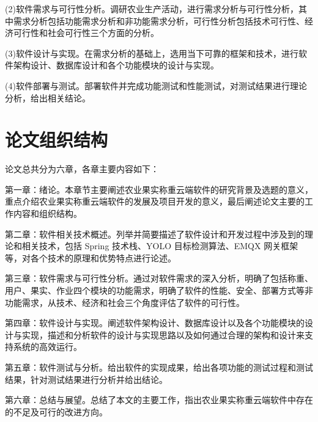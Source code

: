 (2)软件需求与可行性分析。调研农业生产活动，进行需求分析与可行性分析，其中需求分析包括功能需求分析和非功能需求分析，可行性分析包括技术可行性、经济可行性和社会可行性三个方面的分析。

(3)软件设计与实现。在需求分析的基础上，选用当下可靠的框架和技术，进行软件架构设计、数据库设计和各个功能模块的设计与实现。

(4)软件部署与测试。部署软件并完成功能测试和性能测试，对测试结果进行理论分析，给出相关结论。

\section{论文组织结构}

论文总共分为六章，各章主要内容如下：

第一章：绪论。本章节主要阐述农业果实称重云端软件的研究背景及选题的意义，重点介绍农业果实称重云端软件的发展及项目开发的意义，最后阐述论文主要的工作内容和组织结构。

第二章：软件相关技术概述。列举并简要描述了软件设计和开发过程中涉及到的理论和相关技术，包括 Spring 技术栈、YOLO 目标检测算法、EMQX 网关框架等，对各个技术的原理和优势特点进行论述。

第三章：软件需求与可行性分析。通过对软件需求的深入分析，明确了包括称重、用户、果实、作业四个模块的功能需求，明确了软件的性能、安全、部署方式等非功能需求，从技术、经济和社会三个角度评估了软件的可行性。

第四章：软件设计与实现。阐述软件架构设计、数据库设计以及各个功能模块的设计与实现，描述和分析软件的设计与实现思路以及如何通过合理的架构和设计来支持系统的高效运行。

第五章：软件测试与分析。给出软件的实现成果，给出各项功能的测试过程和测试结果，针对测试结果进行分析并给出结论。

第六章：总结与展望。总结了本文的主要工作，指出农业果实称重云端软件中存在的不足及可行的改进方向。
